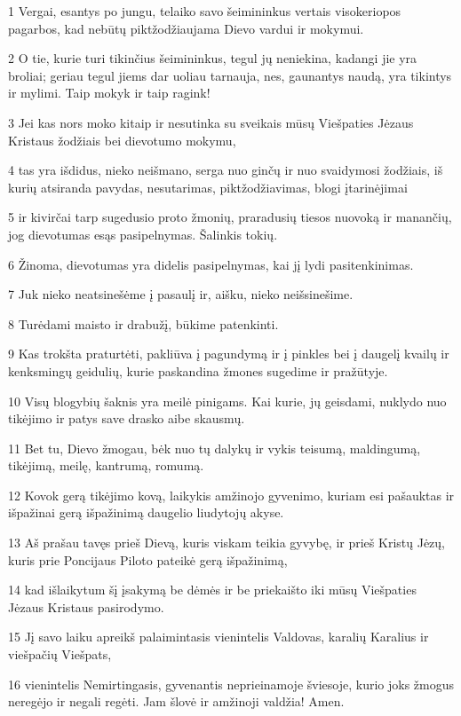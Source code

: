 \par 1 Vergai, esantys po jungu, telaiko savo šeimininkus vertais visokeriopos pagarbos, kad nebūtų piktžodžiaujama Dievo vardui ir mokymui. 
\par 2 O tie, kurie turi tikinčius šeimininkus, tegul jų neniekina, kadangi jie yra broliai; geriau tegul jiems dar uoliau tarnauja, nes, gaunantys naudą, yra tikintys ir mylimi. Taip mokyk ir taip ragink! 
\par 3 Jei kas nors moko kitaip ir nesutinka su sveikais mūsų Viešpaties Jėzaus Kristaus žodžiais bei dievotumo mokymu, 
\par 4 tas yra išdidus, nieko neišmano, serga nuo ginčų ir nuo svaidymosi žodžiais, iš kurių atsiranda pavydas, nesutarimas, piktžodžiavimas, blogi įtarinėjimai 
\par 5 ir kivirčai tarp sugedusio proto žmonių, praradusių tiesos nuovoką ir manančių, jog dievotumas esąs pasipelnymas. Šalinkis tokių. 
\par 6 Žinoma, dievotumas yra didelis pasipelnymas, kai jį lydi pasitenkinimas. 
\par 7 Juk nieko neatsinešėme į pasaulį ir, aišku, nieko neišsinešime. 
\par 8 Turėdami maisto ir drabužį, būkime patenkinti. 
\par 9 Kas trokšta praturtėti, pakliūva į pagundymą ir į pinkles bei į daugelį kvailų ir kenksmingų geidulių, kurie paskandina žmones sugedime ir pražūtyje. 
\par 10 Visų blogybių šaknis yra meilė pinigams. Kai kurie, jų geisdami, nuklydo nuo tikėjimo ir patys save drasko aibe skausmų. 
\par 11 Bet tu, Dievo žmogau, bėk nuo tų dalykų ir vykis teisumą, maldingumą, tikėjimą, meilę, kantrumą, romumą. 
\par 12 Kovok gerą tikėjimo kovą, laikykis amžinojo gyvenimo, kuriam esi pašauktas ir išpažinai gerą išpažinimą daugelio liudytojų akyse. 
\par 13 Aš prašau tavęs prieš Dievą, kuris viskam teikia gyvybę, ir prieš Kristų Jėzų, kuris prie Poncijaus Piloto pateikė gerą išpažinimą, 
\par 14 kad išlaikytum šį įsakymą be dėmės ir be priekaišto iki mūsų Viešpaties Jėzaus Kristaus pasirodymo. 
\par 15 Jį savo laiku apreikš palaimintasis vienintelis Valdovas, karalių Karalius ir viešpačių Viešpats, 
\par 16 vienintelis Nemirtingasis, gyvenantis neprieinamoje šviesoje, kurio joks žmogus neregėjo ir negali regėti. Jam šlovė ir amžinoji valdžia! Amen. 
